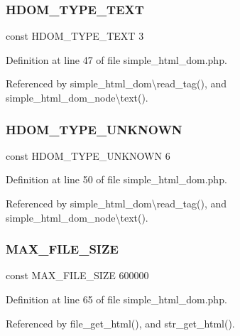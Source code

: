 \subsubsection{\texorpdfstring{H\+D\+O\+M\+\_\+\+T\+Y\+P\+E\+\_\+\+T\+E\+XT}{HDOM\_TYPE\_TEXT}}
{\footnotesize\ttfamily const H\+D\+O\+M\+\_\+\+T\+Y\+P\+E\+\_\+\+T\+E\+XT 3}



Definition at line 47 of file simple\+\_\+html\+\_\+dom.\+php.



Referenced by simple\+\_\+html\+\_\+dom\textbackslash{}read\+\_\+tag(), and simple\+\_\+html\+\_\+dom\+\_\+node\textbackslash{}text().

\hypertarget{simple__html__dom_8php_a1dc6000425365b26eb74247a720d3c33}{}\label{simple__html__dom_8php_a1dc6000425365b26eb74247a720d3c33} 
\subsubsection{\texorpdfstring{H\+D\+O\+M\+\_\+\+T\+Y\+P\+E\+\_\+\+U\+N\+K\+N\+O\+WN}{HDOM\_TYPE\_UNKNOWN}}
{\footnotesize\ttfamily const H\+D\+O\+M\+\_\+\+T\+Y\+P\+E\+\_\+\+U\+N\+K\+N\+O\+WN 6}



Definition at line 50 of file simple\+\_\+html\+\_\+dom.\+php.



Referenced by simple\+\_\+html\+\_\+dom\textbackslash{}read\+\_\+tag(), and simple\+\_\+html\+\_\+dom\+\_\+node\textbackslash{}text().

\hypertarget{simple__html__dom_8php_ae0113eb729c51976f55df15ad1c644c7}{}\label{simple__html__dom_8php_ae0113eb729c51976f55df15ad1c644c7} 
\subsubsection{\texorpdfstring{M\+A\+X\+\_\+\+F\+I\+L\+E\+\_\+\+S\+I\+ZE}{MAX\_FILE\_SIZE}}
{\footnotesize\ttfamily const M\+A\+X\+\_\+\+F\+I\+L\+E\+\_\+\+S\+I\+ZE 600000}



Definition at line 65 of file simple\+\_\+html\+\_\+dom.\+php.



Referenced by file\+\_\+get\+\_\+html(), and str\+\_\+get\+\_\+html().

